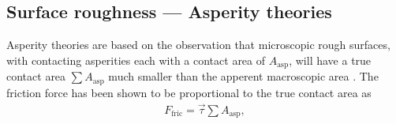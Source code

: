 \subsection{Surface roughness --- Asperity theories}

Asperity theories are based on the observation that microscopic rough surfaces,
with contacting asperities each with a contact area of $A_{\text{asp}}$, will
have a true contact area $\sum A_{\text{asp}}$ much smaller than the apperent
macroscopic area \cite{kim_nano-scale_2009}. The friction
force has been shown to be proportional to the true contact area as 
\begin{align*}
  F_\text{fric} = \vec{\tau} \sum A_{\text{asp}},
\end{align*}

